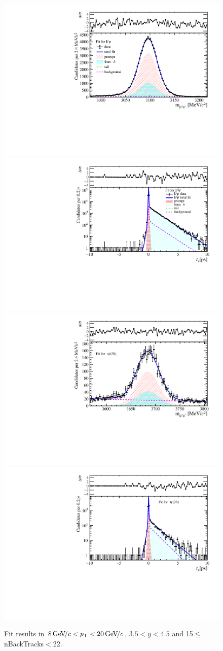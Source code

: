 \begin{figure}[H]
\begin{center}
\includegraphics[width=0.47\linewidth]{pdf/Jpsi/drawmassB/n3y3pt5.pdf}
\includegraphics[width=0.47\linewidth]{pdf/Jpsi/2DFitB/n3y3pt5.pdf}
\vspace*{-0.5cm}
\includegraphics[width=0.47\linewidth]{pdf/Psi2S/drawmassB/n3y3pt5.pdf}
\includegraphics[width=0.47\linewidth]{pdf/Psi2S/2DFitB/n3y3pt5.pdf}
\vspace*{-0.5cm}
\end{center}
\caption{Fit results in $8\text{\,Ge\kern -0.1em V\!/}c<p_{\mathrm{T}}<20\text{\,Ge\kern -0.1em V\!/}c$, $3.5<y<4.5$ and 15$\leq$nBackTracks$<$22.}
\label{Fitn3y3pt5}
\end{figure}
